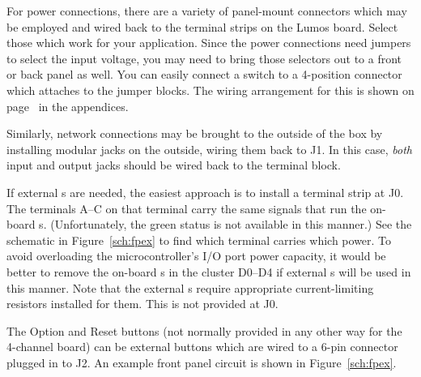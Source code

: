 \documentclass[letterpaper,twoside,onecolumn,openright,final]{memoir}
\begin{document}
For power connections, there are a variety of panel-mount connectors which may be employed and wired
back to the terminal strips on the Lumos board.  Select those which work for your application.
Since the power connections need jumpers to select the input voltage, you may need to bring those
selectors out to a front or back panel as well.  You can easily connect a  switch
to a 4-position connector which attaches to the jumper blocks.  The wiring arrangement for this 
is shown on page~\pageref{sec:voltagesw} in the appendices.

Similarly, network connections may be brought to the outside of the box by installing modular jacks
on the outside, wiring them back to J1.  In this case, \emph{both} input and output jacks should be wired
back to the terminal block.

If external s are needed, the easiest approach is to install a terminal strip at J0.
The terminals A--C on that terminal carry the same signals that run the on-board s.
(Unfortunately, the green status  is not available in this manner.)
See the schematic in Figure~\ref{sch:fpex}
to find which terminal carries which  power.
To avoid overloading the microcontroller's I/O port power capacity, it would be better to remove the
on-board s in the cluster D0--D4 if external s will be used
in this manner.  Note that the external s require appropriate current-limiting resistors
installed for them.  This is not provided at J0.

The Option and Reset buttons (not normally provided in any other way for the 4-channel board) 
can be external buttons which are wired to a 6-pin connector 
plugged in to J2.  An example front panel circuit is shown in Figure~\ref{sch:fpex}.
\end{document}
